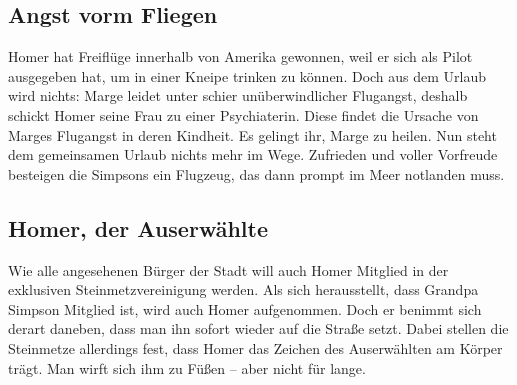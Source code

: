 	
\subsection{Angst vorm Fliegen}\label{2F08}
Homer hat Freiflüge innerhalb von Amerika gewonnen, weil er sich als Pilot ausgegeben hat, um in einer Kneipe trinken zu können. Doch aus dem Urlaub wird nichts: Marge leidet unter schier unüberwindlicher Flugangst, deshalb schickt Homer seine Frau zu einer Psychiaterin. Diese findet die Ursache von Marges Flugangst in deren Kindheit. Es gelingt ihr, Marge zu heilen. Nun steht dem gemeinsamen Urlaub nichts mehr im Wege. Zufrieden und voller Vorfreude besteigen die Simpsons ein Flugzeug, das dann prompt im Meer notlanden muss.


	
\subsection{Homer, der Auserwählte}\label{2F09}
Wie alle angesehenen Bürger der Stadt will auch Homer Mitglied in der exklusiven Steinmetzvereinigung werden. Als sich herausstellt, dass Grandpa Simpson Mitglied ist, wird auch Homer aufgenommen. Doch er benimmt sich derart daneben, dass man ihn sofort wieder auf die Straße setzt. Dabei stellen die Steinmetze allerdings fest, dass Homer das Zeichen des Auserwählten am Körper trägt. Man wirft sich ihm zu Füßen -- aber nicht für lange.


